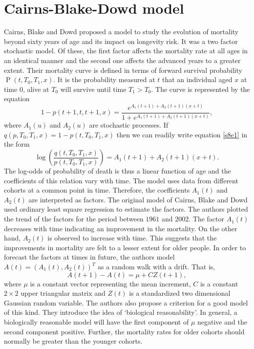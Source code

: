 \documentclass{article}
\numberwithin{equation}{section}
\DeclareMathOperator{\pr}{P}
\begin{document}
\section{Cairns-Blake-Dowd model}\label{s8}
Cairns, Blake and Dowd proposed a model \cite{cairns2006two} to study the
evolution of mortality beyond sixty years of age and its impact on longevity
risk. It was a two factor stochastic model. Of these, the first factor affects
the mortality rate at all ages in an identical manner and the second one 
affects the advanced years to a greater extent. Their mortality curve is
defined in terms of forward survival probability $\pr(t, T_0, T_1, x)$. It is
the probability measured at $t$ that an individual aged $x$ at time $0$,
alive at $T_0$ will survive until time $T_1 > T_0$. The curve is represented
by the equation
\begin{equation}\label{s8e1}
1 - p(t+1,t,t+1,x) = 
\frac{e^{A_1(t+1)+A_2(t+1)(x+t)}}{1+e^{A_1(t+1)+A_2(t+1)(x+t)}},
\end{equation}
where $A_1(u)$ and $A_2(u)$ are stochastic processes. If $q(p, T_0, T_1, x)
= 1 - p(t, T_0, T_1, x)$ then we can readily write equation \eqref{s8e1} in
the form
\begin{equation}\label{s8e2}
\log\left(\frac{q(t,T_0,T_1,x)}{p(t,T_0,T_1,x)}\right) = 
A_1(t+1) + A_2(t+1)(x+t).
\end{equation}
The log-odds of probability of death is thus a linear function of age and the
coefficients of this relation vary with time. The model uses data from 
different cohorts at a common point in time. Therefore, the coefficients 
$A_1(t)$ and $A_2(t)$ are interpreted as factors. The original model of Cairns,
Blake and Dowd used ordinary least square regression to estimate the factors.
The authors plotted the trend of the factors for the period between $1961$ and
$2002$. The factor $A_1(t)$ decreases with time indicating an improvement in
the mortality. On the other hand, $A_2(t)$ is observed to increase with time.
This suggests that the improvements in mortality are felt to a lesser extent 
for older people. In order to forecast the factors at times in future, the 
authors model $A(t) = (A_1(t), A_2(t))^T$ as a random walk with a drift. That
is,
\begin{equation}\label{s8e3}
A(t+1) - A(t) = \mu + CZ(t+1),
\end{equation}
where $\mu$ is a constant vector representing the mean increment, $C$ is a 
constant $2 \times 2$ upper triangular matrix and $Z(t)$ is a standardized
two dimensional Gaussian random variable. The authors also propose a criterion
for a good model of this kind. They introduce the idea of `biological 
reasonability'. In general, a biologically reasonable model will have the 
first component of $\mu$ negative and the second component positive. Further,
the mortality rates for older cohorts should normally be greater than the 
younger cohorts.
\end{document}
